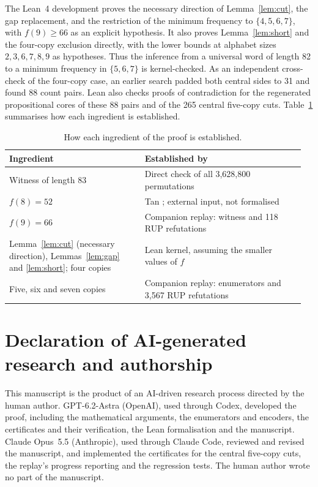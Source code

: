 \documentclass[11pt]{article}
\begin{document}
The Lean~4 \cite{lean4} development proves the necessary direction of Lemma~\ref{lem:cut}, the gap replacement, and the restriction of the minimum frequency to $\{4,5,6,7\}$, with $f(9)\ge66$ as an explicit hypothesis. It also proves Lemma~\ref{lem:short} and the four-copy exclusion directly, with the lower bounds at alphabet sizes $2,3,6,7,8,9$ as hypotheses. Thus the inference from a universal word of length 82 to a minimum frequency in $\{5,6,7\}$ is kernel-checked. As an independent cross-check of the four-copy case, an earlier search padded both central sides to 31 and found 88 count pairs. Lean also checks proofs of contradiction for the regenerated propositional cores of these 88 pairs and of the 265 central five-copy cuts. Table~\ref{tab:scope} summarises how each ingredient is established.

\begin{table}[ht]
\centering\small
\begin{tabular}{@{}p{0.44\linewidth}p{0.52\linewidth}@{}}
\toprule
Ingredient & Established by\\
\midrule
Witness of length 83 & Direct check of all 3,628,800 permutations\\
$f(8)=52$ & Tan \cite{tan}; external input, not formalised\\
$f(9)=66$ & Companion replay: witness and 118 RUP refutations\\
Lemma~\ref{lem:cut} (necessary direction), Lemmas~\ref{lem:gap} and \ref{lem:short}; four copies & Lean kernel, assuming the smaller values of $f$\\
Five, six and seven copies & Companion replay: enumerators and 3,567 RUP refutations\\
\bottomrule
\end{tabular}
\caption{How each ingredient of the proof is established.}\label{tab:scope}
\end{table}

\section*{Declaration of AI-generated research and authorship}
This manuscript is the product of an AI-driven research process directed by the human author. GPT-6.2-Astra (OpenAI), used through Codex, developed the proof, including the mathematical arguments, the enumerators and encoders, the certificates and their verification, the Lean formalisation and the manuscript. Claude Opus~5.5 (Anthropic), used through Claude Code, reviewed and revised the manuscript, and implemented the certificates for the central five-copy cuts, the replay's progress reporting and the regression tests. The human author wrote no part of the manuscript.
\end{document}
